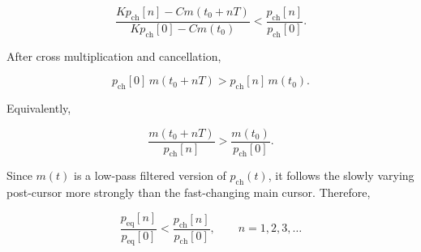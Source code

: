 \begin{equation}
\frac{Kp_{\mathrm{ch}}[n]-Cm(t_0+nT)}
{Kp_{\mathrm{ch}}[0]-Cm(t_0)}
<
\frac{p_{\mathrm{ch}}[n]}
{p_{\mathrm{ch}}[0]}.
\end{equation}

After cross multiplication and cancellation,

\begin{equation}
p_{\mathrm{ch}}[0]\,m(t_0+nT)
>
p_{\mathrm{ch}}[n]\,m(t_0).
\end{equation}

Equivalently,

\begin{equation}
\frac{m(t_0+nT)}{p_{\mathrm{ch}}[n]}
>
\frac{m(t_0)}{p_{\mathrm{ch}}[0]}.
\end{equation}

Since \(m(t)\) is a low-pass filtered version of
\(p_{\mathrm{ch}}(t)\), it follows the slowly varying post-cursor
more strongly than the fast-changing main cursor. Therefore,

\begin{equation}
\frac{p_{\mathrm{eq}}[n]}{p_{\mathrm{eq}}[0]}
<
\frac{p_{\mathrm{ch}}[n]}{p_{\mathrm{ch}}[0]},
\qquad n=1,2,3,\ldots
\end{equation}


